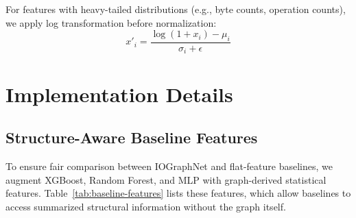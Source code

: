 For features with heavy-tailed distributions (e.g., byte counts, operation counts), we apply log transformation before normalization:
\begin{equation}
x'_i = \frac{\log(1 + x_i) - \mu_i}{\sigma_i + \epsilon}
\end{equation}

\section{Implementation Details}
\label{app:implementation}

\subsection{Structure-Aware Baseline Features}

To ensure fair comparison between IOGraphNet and flat-feature baselines, we augment XGBoost, Random Forest, and MLP with graph-derived statistical features.
Table~\ref{tab:baseline-features} lists these features, which allow baselines to access summarized structural information without the graph itself.

\begin{table}[ht]
\caption{Structure-aware features for baseline models}
\label{tab:baseline-features}
\small
{}
\end{table}

